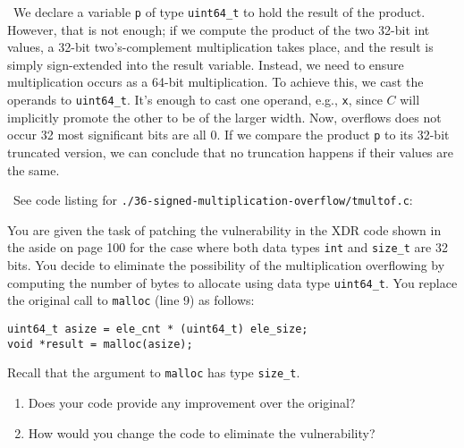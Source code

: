 \documentclass[12pt]{article}
\newenvironment{ex}[2][Exercise]{\begin{trivlist}
		\item[\hskip \labelsep {\bfseries #1}\hskip \labelsep {\bfseries #2.}]}{\end{trivlist}}
\newenvironment{sol}[1][Solution]{\begin{trivlist}
		\item[\hskip \labelsep {\bfseries #1:}]}{\end{trivlist}}
\begin{document}
\begin{sol}
	\
	We declare a variable \texttt{p} of type \texttt{uint64\_t} to hold
	the result of the product. However, that is not enough; if we compute
	the product of the two 32-bit int values, a 32-bit two's-complement
	multiplication takes place, and the result is simply sign-extended
	into the result variable. Instead, we need to ensure multiplication
	occurs as a 64-bit multiplication. To achieve this, we cast the operands
	to \texttt{uint64\_t}. It's enough to cast one operand, e.g., \texttt{x},
	since $C$ will implicitly promote the other to be of the larger
	width. Now, overflows does not occur 32 most significant bits are all
	0. If we compare the product \texttt{p} to its 32-bit truncated
	version, we can conclude that no truncation happens if their
	values are the same. 
	
	\
	See code listing for \texttt{./36-signed-multiplication-overflow/tmultof.c}:
	
\end{sol}

\begin{ex}{2.37}
	You are given the task of patching the vulnerability in the XDR code
	shown in the aside on page 100 for the case where both data types
	\texttt{int} and \texttt{size\_t} are 32 bits. You decide to eliminate
	the possibility of the multiplication overflowing by computing the
	number of bytes to allocate using data type \texttt{uint64\_t}.
	You replace the original call to \texttt{malloc} (line 9) as follows:
	\begin{lstlisting}
uint64_t asize = ele_cnt * (uint64_t) ele_size;
void *result = malloc(asize);
	\end{lstlisting}
	Recall that the argument to \texttt{malloc} has type \texttt{size\_t}.
	\begin{enumerate}
		\item Does your code provide any improvement over the original?
		\item How would you change the code to eliminate the
		vulnerability?
	\end{enumerate}
\end{ex}
\end{document}
